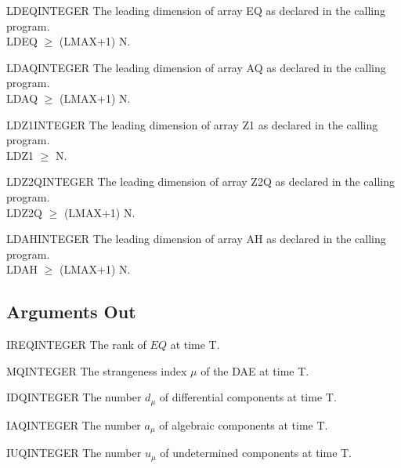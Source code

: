 \begin{entry}{LDEQ}{INTEGER}
  The leading dimension of array EQ as declared in the calling
  program. \\
  LDEQ $\ge$ (LMAX+1) N.
\end{entry}

\begin{entry}{LDAQ}{INTEGER}
  The leading dimension of array AQ as declared in the calling
  program.\\
  LDAQ $\ge$ (LMAX+1) N.
\end{entry}

\begin{entry}{LDZ1}{INTEGER}
  The leading dimension of array Z1 as declared in the calling
  program.\\
  LDZ1 $\ge$ N.
\end{entry}

\begin{entry}{LDZ2Q}{INTEGER}
  The leading dimension of array Z2Q as declared in the calling
  program.\\
  LDZ2Q $\ge$ (LMAX+1) N.
\end{entry}

\begin{entry}{LDAH}{INTEGER}
  The leading dimension of array AH as declared in the calling
  program.\\
  LDAH $\ge$ (LMAX+1) N.
\end{entry}

\subsection{Arguments Out}

\begin{entry}{IREQ}{INTEGER}
  The rank of $EQ$ at time T.
\end{entry}

\begin{entry}{MQ}{INTEGER}
  The strangeness index $\mu$ of the DAE at time T.
\end{entry}
\begin{entry}{IDQ}{INTEGER}
  The number $d_{\mu}$ of differential components at time T.
\end{entry}

\begin{entry}{IAQ}{INTEGER}
  The number $a_{\mu}$ of algebraic  components at time T.
\end{entry}

\begin{entry}{IUQ}{INTEGER}
  The number $u_{\mu}$ of undetermined components at time T.
\end{entry}

